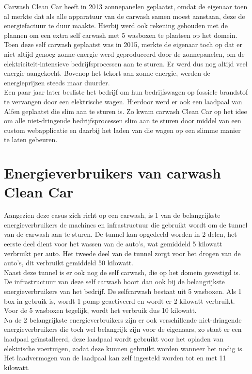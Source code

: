 Carwash Clean Car heeft in 2013 zonnepanelen geplaatst, omdat de eigenaar toen al merkte dat als alle apparatuur van de carwash samen moest aanstaan, deze de energiefactuur te duur maakte. Hierbij werd ook rekening gehouden met de plannen om een extra self carwash met 5 wasboxen te plaatsen op het domein. Toen deze self carwash geplaatst was in 2015, merkte de eigenaar toch op dat er niet altijd genoeg zonne-energie werd geproduceerd door de zonnepanelen, om de elektriciteit-intensieve bedrijfsprocessen aan te sturen. Er werd dus nog altijd veel energie aangekocht. Bovenop het tekort aan zonne-energie, werden de energieprijzen steeds maar duurder.\\

Een paar jaar later besliste het bedrijf om hun bedrijfswagen op fossiele brandstof te vervangen door een elektrische wagen. Hierdoor werd er ook een laadpaal van Alfen geplaatst die slim aan te sturen is. Zo kwam carwash Clean Car op het idee om alle niet-dringende bedrijfsprocessen slim aan te sturen door middel van een custom webapplicatie en daarbij het laden van die wagen op een slimme manier te laten gebeuren.

\section{Energieverbruikers van carwash Clean Car}
\label{sec:stand-van-zaken-energieverbruikers}

Aangezien deze casus zich richt op een carwash, is 1 van de belangrijkste energieverbruikers de machines en infrastructuur die gebruikt wordt om de tunnel van de carwash aan te sturen. De tunnel kan opgedeeld worden in 2 delen, het eerste deel dient voor het wassen van de auto’s, wat gemiddeld 5 kilowatt verbruikt per auto. Het tweede deel van de tunnel zorgt voor het drogen van de auto’s, dit verbruikt gemiddeld 50 kilowatt.\\

Naast deze tunnel is er ook nog de self carwash, die op het domein gevestigd is. De infrastructuur van deze self carwash hoort dan ook bij de belangrijkste energieverbruikers van het bedrijf. De selfcarwash bestaat uit 5 wasboxen. Als 1 box in gebruik is, wordt 1 pomp geactiveerd en wordt er 2 kilowatt verbruikt. Voor de 5 wasboxen tegelijk, wordt het verbruik dus 10 kilowatt.\\

Na de 2 belangrijkste energieverbruikers zijn er ook verschillende niet-dringende energieverbruikers die toch wel belangrijk zijn voor de eigenaars, zo staat er een laadpaal geïnstalleerd, deze laadpaal wordt gebruikt voor het opladen van elektrische voertuigen, zodat deze kunnen gebruikt worden wanneer het nodig is. Het laadvermogen van de laadpaal kan zelf ingesteld worden tot en met 11 kilowatt.\\

